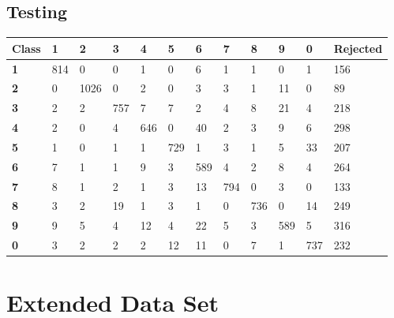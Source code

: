 \documentclass[
  a4paper,            %
  DIV=10,             %
  oneside,            %
  BCOR=5mm,           %
  parskip=half,       %
  numbers=noenddot,   %
  bibtotoc,           %
  listof=totoc        %
]{scrreprt}
\begin{document}
\subsection{Testing}
\begin{center}
  \begin{tabular}{|p{1cm}|p{1cm}|p{1cm}|p{1cm}|p{1cm}|p{1cm}|p{1cm}|p{1cm}|p{1cm}|p{1cm}|p{1cm}|p{1.7cm}|}
    \hline
    \textbf{Class} & \textbf{1} & \textbf{2} & \textbf{3} & \textbf{4} & \textbf{5} & \textbf{6} & \textbf{7} & \textbf{8} & \textbf{9} & \textbf{0} & \textbf{Rejected} \\
    \hline
    \textbf{1} & 814 & 0 & 0 & 1 & 0 & 6 & 1 & 1 & 0 & 1 & 156 \\
    \hline
    \textbf{2} & 0 & 1026 & 0 & 2 & 0 & 3 & 3 & 1 & 11 & 0 & 89 \\
    \hline
    \textbf{3} & 2 & 2 & 757 & 7 & 7 & 2 & 4 & 8 & 21 & 4 & 218 \\
    \hline
    \textbf{4} & 2 & 0 & 4 & 646 & 0 & 40 & 2 & 3 & 9 & 6 & 298 \\
    \hline
    \textbf{5} & 1 & 0 & 1 & 1 & 729 & 1 & 3 & 1 & 5 & 33 & 207 \\
    \hline
    \textbf{6} & 7 & 1 & 1 & 9 & 3 & 589 & 4 & 2 & 8 & 4 & 264 \\
    \hline
    \textbf{7} & 8 & 1 & 2 & 1 & 3 & 13 & 794 & 0 & 3 & 0 & 133 \\
    \hline
    \textbf{8} & 3 & 2 & 19 & 1 & 3 & 1 & 0 & 736 & 0 & 14 & 249 \\
    \hline
    \textbf{9} & 9 & 5 & 4 & 12 & 4 & 22 & 5 & 3 & 589 & 5 & 316 \\
    \hline
    \textbf{0} & 3 & 2 & 2 & 2 & 12 & 11 & 0 & 7 & 1 & 737 & 232 \\
    \hline
  \end{tabular}
\end{center}
\section{Extended Data Set}
\end{document}
